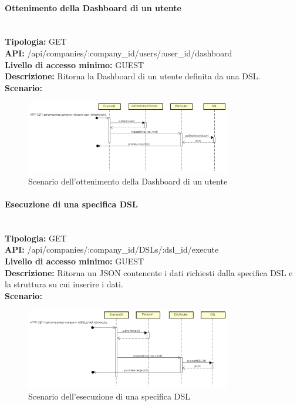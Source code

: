 \newpage
\paragraph{Ottenimento della Dashboard di un utente}\mbox{}\\
\textbf{Tipologia:} GET \\
\textbf{API:} /api/companies/:company\_id/users/:user\_id/dashboard \\
\textbf{Livello di accesso minimo:} GUEST \\
\textbf{Descrizione:} Ritorna la Dashboard di un utente definita da una DSL. \\
\textbf{Scenario:}  
\begin{figure}[H]
\centering
\includegraphics[width=0.8\textwidth]{res/sections/backend/sequence/(GET)dashboard.png}
\caption{Scenario dell'ottenimento della Dashboard di un utente}
\end{figure}

\newpage
\paragraph{Esecuzione di una specifica DSL}\mbox{}\\
\textbf{Tipologia:} GET \\
\textbf{API:} /api/companies/:company\_id/DSLs/:dsl\_id/execute \\
\textbf{Livello di accesso minimo:} GUEST \\
\textbf{Descrizione:} Ritorna un JSON contenente i dati richiesti dalla specifica DSL e la struttura su cui inserire i dati. \\
\textbf{Scenario:} 
\begin{figure}[H]
\centering
\includegraphics[width=0.8\textwidth]{res/sections/backend/sequence/(GET)dslByIDex.png}
\caption{Scenario dell'esecuzione di una specifica DSL}
\end{figure}

